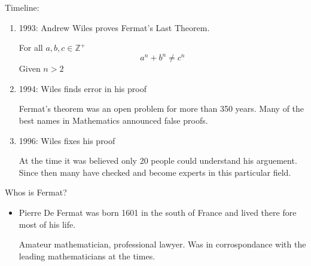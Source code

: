 \documentclass{report}
\begin{document}
\begin{description}
    \item Timeline:
        \begin{enumerate}
            \item 1993: Andrew Wiles proves
                Fermat's Last Theorem.
                \begin{mdframed}
                    For all $a, b, c \in \mathbb{Z}^+$
                     \begin{displaymath}
                        a^n + b^n \neq c^n
                    \end{displaymath}
                    Given $n > 2$
                \end{mdframed}
            \item 1994: Wiles finds error in his proof
                \begin{mdframed}
                    Fermat's theorem was an open problem
                    for more than 350 years. Many of the
                    best names in Mathematics announced false
                    proofs.
                \end{mdframed}
            \item 1996: Wiles fixes his proof
                \begin{mdframed}
                    At the time it was believed only
                    20 people could understand his arguement.
                    Since then many have checked and become 
                    experts in this particular field.
                \end{mdframed}
        \end{enumerate}
    \item Whos is Fermat?
        \begin{itemize}
            \item Pierre De Fermat was born 1601
                in the south of France and lived
                there fore most of his life.
                \begin{mdframed}
                    Amateur mathematician, professional lawyer.
                    Was in corrospondance with the leading
                    mathematicians at the times.


\end{mdframed}
\end{itemize}
\end{description}
\end{document}
